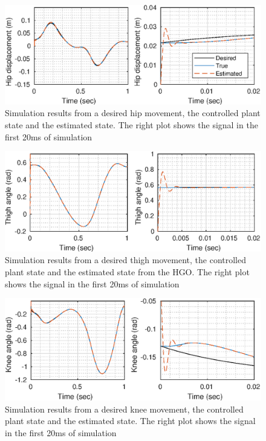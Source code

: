 \documentclass[letterpaper, 10 pt, conference]{ieeeconf}  %
\theoremstyle{plain}
\theoremstyle{definition}
\theoremstyle{remark}
\begin{document}
\begin{figure}[h!]
	\begin{center}
	\includegraphics[width = \columnwidth]{Figs/q_hip_mu_fix_1e-03.eps}
	\caption{ Simulation results from a desired hip movement, the controlled plant state and the estimated state. The right plot shows the signal in the first 20ms of simulation}
	\label{fig:hip}
	\end{center}
\end{figure}
%
%
\begin{figure}[h!]
	\begin{center}
	\includegraphics[width = \columnwidth]{Figs/q_thigh_mu_fix_1e-03.eps}
	\caption{ Simulation results from a desired thigh movement, the controlled plant state and the estimated state from the HGO. The right plot shows the signal in the first 20ms of simulation}
	\label{fig:thigh}
	\end{center}
\end{figure}
%
%
\begin{figure}[h!]
	\begin{center}
	\includegraphics[width = \columnwidth]{Figs/q_knee_mu_fix_1e-03.eps}
	\caption{ Simulation results from a desired knee movement, the controlled plant state and the estimated state. The right plot shows the signal in the first 20ms of simulation}
	\label{fig:knee}
	\end{center}
\end{figure}
\end{document}

